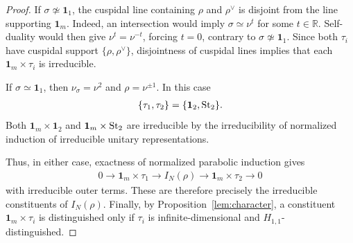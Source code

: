 \documentclass[11pt,leqno]{amsart}
\numberwithin{equation}{section}
\theoremstyle{plain}
\theoremstyle{definition}
\theoremstyle{remark}
\newcommand{\one}{\mathbf{1}}
\begin{document}
\begin{proof}
		If $\sigma\not\simeq\one_1$, the cuspidal line containing
		$\rho$ and $\rho^\vee$ is disjoint from the line supporting
		$\one_m$. 
		Indeed, an intersection would imply
		$\sigma\simeq\nu^t$ for some $t\in\mathbb R$.
		Self-duality would then give $\nu^t=\nu^{-t}$, forcing $t=0$,
		contrary to $\sigma\not\simeq\one_1$.
		Since both $\tau_i$ have cuspidal support
		$\{\rho,\rho^\vee\}$, disjointness of cuspidal lines implies
		that each $\one_m\times\tau_i$ is irreducible.
		
		If $\sigma\simeq\one_1$, then
		$\nu_\sigma=\nu^2$ and $\rho=\nu^{\pm1}$.
		In this case
		\begin{align*}
			\{\tau_1,\tau_2\}=\{\one_2, {\rm St}_2\}.
		\end{align*}
		Both $\one_m\times\one_2$ and
		$\one_m\times {\rm St}_2$ are irreducible by
		the irreducibility of normalized induction of irreducible
		unitary representations.
		
		Thus, in either case, exactness of normalized parabolic induction
		gives
		\begin{align*}
			0\longrightarrow\one_m\times\tau_1
			\longrightarrow I_N(\rho)
			\longrightarrow\one_m\times\tau_2
			\longrightarrow0
		\end{align*}
		with irreducible outer terms. These are therefore precisely the
		irreducible constituents of $I_N(\rho)$.
		Finally, by Proposition~\ref{lem:character}, a constituent
		$\one_m\times\tau_i$ is distinguished only if $\tau_i$ is
		infinite-dimensional and $H_{1,1}$-distinguished.
	\end{proof}
	
	
\end{document}
